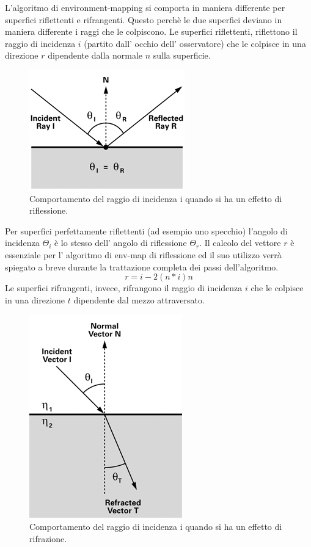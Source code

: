 L’algoritmo di environment-mapping si comporta in maniera differente per superfici riflettenti e rifrangenti. Questo perchè le due superfici deviano in maniera differente i raggi che le colpiscono.
Le superfici riflettenti, riflettono il raggio di incidenza $i$ (partito dall’ occhio dell’ osservatore) che le colpisce in una direzione $r$ dipendente dalla normale $n$ sulla superficie.
\\
\begin{figure}[htb]
 \centering
 \includegraphics[width=0.5\linewidth]{images/chapter_stato_arte/stato_arte_inc_refl.png}\hfill
 \caption[Env map: riflessione]{Comportamento del raggio di incidenza i quando si ha un effetto di riflessione.}
 \label{fig:stato_arte_inc_refl}
\end{figure}

Per superfici perfettamente riflettenti (ad esempio uno specchio) l’angolo di incidenza $\Theta_i$ è lo stesso dell’ angolo di riflessione $\Theta_r$.
Il calcolo del vettore $r$ è essenziale per l’ algoritmo di env-map di riflessione ed il suo utilizzo verrà spiegato a breve durante la trattazione completa dei passi dell’algoritmo.
\begin{equation}
r = i - 2(n * i)n
\end{equation}
Le superfici rifrangenti, invece, rifrangono  il raggio di incidenza $i$ che le colpisce in una direzione $t$ dipendente dal mezzo attraversato.
\\
\begin{figure}[htb]
 \centering
 \includegraphics[width=0.5\linewidth]{images/chapter_stato_arte/stato_arte_refr.png}\hfill
 \caption[Env map: rifrazione]{Comportamento del raggio di incidenza i quando si ha un effetto di rifrazione.}
 \label{fig:stato_arte_refr}
\end{figure}

